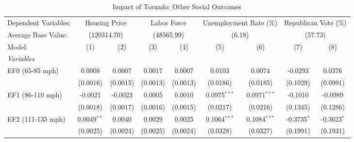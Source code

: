 \documentclass[letterpaper]{article}
\begin{document}
\begin{table}[H]
    \centering
    \caption{Impact of Tornado: Other Social Outcomes}
    \label{t2}
    \small
\begin{tabular}{lcccccccc}
   \tabularnewline \midrule \midrule
   Dependent Variables: & \multicolumn{2}{c}{Housing Price} & \multicolumn{2}{c}{Labor Force} & \multicolumn{2}{c}{Unemployment Rate (\%)} & \multicolumn{2}{c}{Republican Vote (\%)}\\
   Average Base Value: & \multicolumn{2}{c}{(120314.70)} & \multicolumn{2}{c}{(48565.99)} & \multicolumn{2}{c}{(6.18)} & \multicolumn{2}{c}{(57.73)}\\
   Model:          & (1)                      & (2)                           & (3)                           & (4)                             & (5)                          & (6)                            & (7)                           & (8)\\  
   \midrule
   \emph{Variables}\\
   EF0 (65-85 mph) & 0.0008                   & 0.0007                        & 0.0017                        & 0.0007                          & 0.0103                       & 0.0074                         & -0.0293                       & 0.0376\\   
                   & (0.0016)                 & (0.0015)                      & (0.0013)                      & (0.0013)                        & (0.0186)                     & (0.0185)                       & (0.1029)                      & (0.0991)\\   
   EF1 (86-110 mph) & -0.0021                  & -0.0023                       & 0.0005                        & 0.0010                          & 0.0975$^{***}$               & 0.0971$^{***}$                 & -0.1010                       & -0.0989\\   
                   & (0.0018)                 & (0.0017)                      & (0.0016)                      & (0.0015)                        & (0.0217)                     & (0.0216)                       & (0.1345)                      & (0.1286)\\   
   EF2 (111-135 mph) & 0.0049$^{**}$            & 0.0040                        & 0.0029                        & 0.0025                          & 0.1064$^{***}$               & 0.1084$^{***}$                 & -0.3735$^{*}$                 & -0.3623$^{*}$\\   
                   & (0.0025)                 & (0.0024)                      & (0.0025)                      & (0.0024)                        & (0.0328)                     & (0.0327)                       & (0.1991)                      & (0.1931)\\   

\end{tabular}
\end{table}
\end{document}
